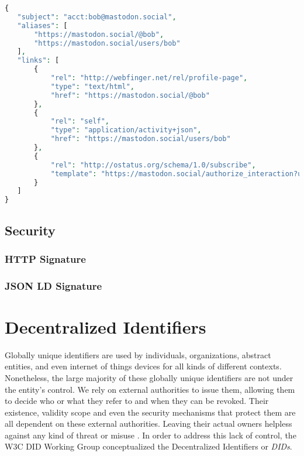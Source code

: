 \begin{lstlisting}[language=PHP, caption=Webfinger response, label=Webfinger response from mastodon.social]
{
   "subject": "acct:bob@mastodon.social",
   "aliases": [
       "https://mastodon.social/@bob",
       "https://mastodon.social/users/bob"
   ],
   "links": [
       {
           "rel": "http://webfinger.net/rel/profile-page",
           "type": "text/html",
           "href": "https://mastodon.social/@bob"
       },
       {
           "rel": "self",
           "type": "application/activity+json",
           "href": "https://mastodon.social/users/bob"
       },
       {
           "rel": "http://ostatus.org/schema/1.0/subscribe",
           "template": "https://mastodon.social/authorize_interaction?uri={uri}"
       }
   ]
}
\end{lstlisting}

\subsection{Security}

\subsubsection{HTTP Signature}

\subsubsection{JSON LD Signature}



\section{Decentralized Identifiers} \label{section:dids}

Globally unique identifiers are used by individuals, organizations, abstract entities, and even internet of things devices for all kinds of different contexts. Nonetheless, the large majority of these globally unique identifiers are not under the entity's control. We rely on external authorities to issue them, allowing them to decide who or what they refer to and when they can be revoked. Their existence, validity scope and even the security mechanisms that protect them are all dependent on these external authorities. Leaving their actual owners helpless against any kind of threat or misuse \cite{sporny_longley_sabadello_reed_steele_2021}. In order to address this lack of control, the W3C DID Working Group conceptualized the Decentralized Identifiers or \emph{DIDs}.

